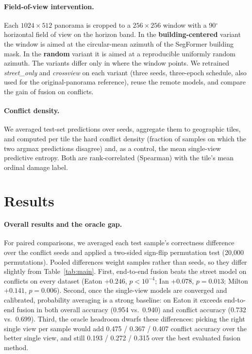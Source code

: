 \documentclass[sigconf]{acmart}
\begin{document}
\paragraph{Field-of-view intervention.}
Each $1024\times512$ panorama is cropped to a $256\times256$ window with a
90$^\circ$ horizontal field of view on the horizon band. In the
\textbf{building-centered} variant the window is aimed at the circular-mean
azimuth of the SegFormer building mask. In the \textbf{random} variant it is
aimed at a reproducible uniformly random azimuth. The variants differ only
in where the window points. We retrained \textit{street\_only} and \textit{crossview} on each
variant (three seeds, three-epoch schedule, also used for the
original-panorama reference), reuse the remote models, and compare the
gain of fusion on conflicts.

\paragraph{Conflict density.}
We averaged test-set predictions over seeds, aggregate them to geographic
tiles, and computed per tile the hard conflict density (fraction of samples on
which the two argmax predictions disagree) and, as a control, the mean
single-view predictive entropy. Both are rank-correlated (Spearman) with the
tile's mean ordinal damage label.

\section{Results}
\label{sec:results}
\paragraph{Overall results and the oracle gap.}
For paired comparisons, we averaged each test sample's correctness difference
over the conflict seeds and applied a two-sided sign-flip
permutation test (20,000 permutations). Pooled differences weight samples
rather than seeds, so they differ slightly from Table~\ref{tab:main}. First,
end-to-end fusion beats the street model on conflicts on every dataset
(Eaton $+0.246$, $p<10^{-4}$; Ian $+0.078$, $p=0.013$; Milton $+0.141$,
$p=0.006$). Second, once the single-view models are converged and calibrated,
probability averaging is a strong baseline: on Eaton it exceeds end-to-end
fusion in both overall accuracy (0.954 vs.\ 0.940) and conflict accuracy
(0.732 vs.\ 0.699). Third, the
oracle headroom dwarfs these differences: picking the right single view per
sample would add 0.475 / 0.367 / 0.407 conflict accuracy over the better
single view, and still 0.193 / 0.272 / 0.315 over the best evaluated fusion
method.
\end{document}
